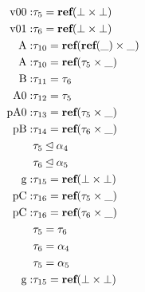 $$\begin{aligned}  \text{v00}:   & \tau_{5} = \text{\bf ref}(\bot \times \bot) \\ \text{v01}:   & \tau_{6} = \text{\bf ref}(\bot \times \bot) \\   \text{A}     :& \tau_{10} = \text{\bf ref}(\text{\bf ref}(\_) \times \_) \\  \text{A}     :& \tau_{10} = \text{\bf ref}(\tau_{5} \times \_) \\  \text{B}     :& \tau_{11} = \tau_{6} \\ \text{A0}    :& \tau_{12} = \tau_{5} \\ \text{pA0}   :& \tau_{13} = \text{\bf ref}(\tau_{5} \times \_) \\ \text{pB}    :& \tau_{14} = \text{\bf ref}(\tau_{6} \times \_) \\ & \tau_{5} \unlhd \alpha_{4} \\ & \tau_{6} \unlhd \alpha_{5} \\ \text{g}     :& \tau_{15} = \text{\bf ref}(\bot \times \bot) \\ \text{pC}    :& \tau_{16} = \text{\bf ref}(\tau_{5} \times \_) \\ \text{pC}    :& \tau_{16} = \text{\bf ref}(\tau_{6} \times \_) \\ & \tau_{5} = \tau_{6} \\ & \tau_{6} = \alpha_{4} \\ & \tau_{5} = \alpha_{5} \\ \text{g}     :& \tau_{15} = \text{\bf ref}(\bot \times \bot) \end{aligned}$$